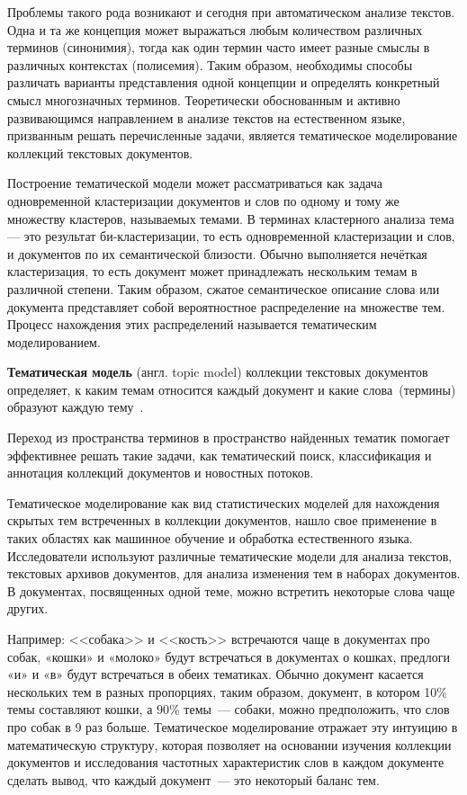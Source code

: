 Проблемы такого рода возникают и сегодня при автоматическом анализе текстов. Одна и та же концепция может выражаться любым количеством различных терминов (синонимия), тогда как один термин часто имеет разные смыслы в различных контекстах (полисемия). Таким образом, необходимы способы различать варианты представления одной концепции и определять конкретный смысл многозначных терминов. Теоретически обоснованным и активно развивающимся направлением в анализе текстов на естественном языке, призванным решать перечисленные задачи, является тематическое моделирование коллекций текстовых документов.   

Построение тематической модели может рассматриваться как задача одновременной кластеризации документов и слов по одному и тому же множеству кластеров, называемых темами. В терминах кластерного анализа тема — это результат би-кластеризации, то есть одновременной кластеризации и слов, и документов по их семантической близости. Обычно выполняется нечёткая кластеризация, то есть документ может принадлежать нескольким темам в различной степени. Таким образом, сжатое семантическое описание слова или документа представляет собой вероятностное распределение на множестве тем. Процесс нахождения этих распределений называется тематическим моделированием. 

\textbf{Тематическая модель} (англ. topic model) коллекции текстовых документов определяет, к каким темам относится каждый документ и какие слова~(термины) образуют каждую тему~\cite{ML_PTM}. 

Переход из пространства терминов в пространство найденных тематик помогает эффективнее решать такие задачи, как тематический поиск, классификация и аннотация коллекций документов и новостных потоков.

Тематическое моделирование как вид статистических моделей для нахождения скрытых тем встреченных в коллекции документов, нашло свое применение в таких областях как машинное обучение и обработка естественного языка. Исследователи используют различные тематические модели для анализа текстов, текстовых архивов документов, для анализа изменения тем в наборах документов. В документах, посвященных одной теме, можно встретить некоторые слова чаще других. 

Например: <<собака>> и <<кость>> встречаются чаще в документах про собак, «кошки» и «молоко» будут встречаться в документах о кошках, предлоги «и» и «в» будут встречаться в обеих тематиках. Обычно документ касается нескольких тем в разных пропорциях, таким образом, документ, в котором 10\% темы составляют кошки, а 90\% темы~--- собаки, можно предположить, что слов про собак в 9 раз больше. Тематическое моделирование отражает эту интуицию в математическую структуру, которая позволяет на основании изучения коллекции документов и исследования частотных характеристик слов в каждом документе сделать вывод, что каждый документ~--- это некоторый баланс тем.

